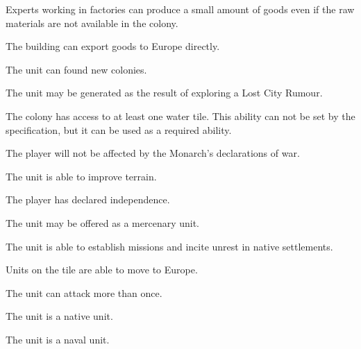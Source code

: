 \documentclass[12pt]{book}
\begin{document}
Experts working in factories can produce a small amount of goods even
if the raw materials are not available in the colony.

\affectsBuilding

The building can export goods to Europe directly.

\affectsUnit

The unit can found new colonies.

\affectsUnit

The unit may be generated as the result of exploring a Lost City Rumour.

\affectsColony

The colony has access to at least one water tile. This ability can not
be set by the specification, but it can be used as a required ability.

\affectsPlayer

The player will not be affected by the Monarch's declarations of war.

\affectsUnit

The unit is able to improve terrain.

\affectsPlayer

The player has declared independence.

\affectsUnit

The unit may be offered as a mercenary unit.

\affectsUnit

The unit is able to establish missions and incite unrest in native
settlements.

\affectsTile

Units on the tile are able to move to Europe.

\affectsUnit

The unit can attack more than once.

\affectsUnit

The unit is a native unit.

\affectsUnit

The unit is a naval unit.

\affectsUnit
\end{document}
